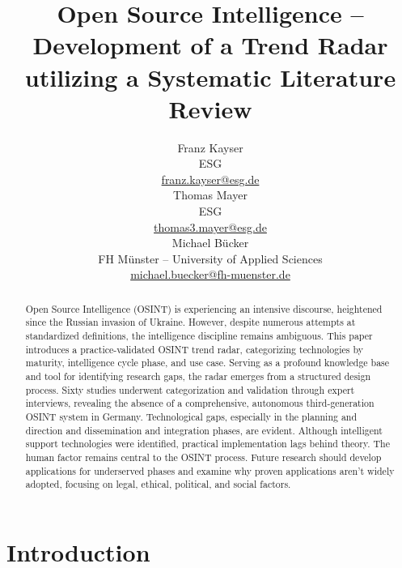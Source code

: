 \documentclass[10pt]{article}
\title{Open Source Intelligence -- Development of a Trend Radar utilizing a Systematic Literature Review}
\author{Franz Kayser \\
  ESG \\
  {\underline{ franz.kayser@esg.de}} \\\And
  Thomas Mayer \\
  ESG  \\
  {\underline{ thomas3.mayer@esg.de} }\\\And 
  Michael Bücker \\
  FH Münster -- University of Applied Sciences\\
  {\underline{michael.buecker@fh-muenster.de}} \\}
\date{}
\begin{document}
\maketitle
\begin{abstract}
    Open Source Intelligence (OSINT) is experiencing an intensive discourse,
    heightened since the Russian invasion of Ukraine. However, despite numerous attempts
    at standardized definitions, the intelligence discipline remains ambiguous. This paper
    introduces a practice-validated OSINT trend radar, categorizing technologies by maturity,
    intelligence cycle phase, and use case. Serving as a profound knowledge base and tool for
    identifying research gaps, the radar emerges from a structured design process. Sixty
    studies underwent categorization and validation through expert interviews,
    revealing the absence of a comprehensive, autonomous third-generation OSINT
    system in Germany. Technological gaps, especially in the planning and direction and
    dissemination and integration phases, are evident. Although intelligent support
    technologies were identified, practical implementation lags behind theory. The human
    factor remains central to the OSINT process. Future research should develop
    applications for underserved phases and examine why proven applications aren't widely
    adopted, focusing on legal, ethical, political, and social factors.
\end{abstract}

\section{Introduction} \label{sec:introduction}
\end{document}
